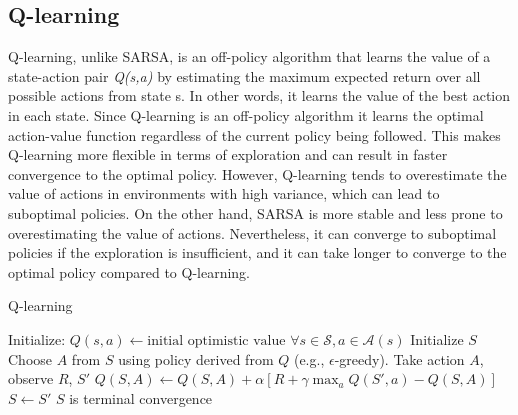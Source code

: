 \subsection{Q-learning}
Q-learning, unlike SARSA, is an off-policy algorithm that learns the value of a state-action pair \textit{Q(s,a)} by estimating the maximum expected return over all possible actions from state s. In other words, it learns the value of the best action in each state. Since Q-learning is an off-policy algorithm it learns the optimal action-value function regardless of the current policy being followed. This makes Q-learning more flexible in terms of exploration and can result in faster convergence to the optimal policy. However, Q-learning tends to overestimate the value of actions in environments with high variance, which can lead to suboptimal policies. On the other hand, SARSA is more stable and less prone to overestimating the value of actions. Nevertheless, it can converge to suboptimal policies if the exploration is insufficient, and it can take longer to converge to the optimal policy compared to Q-learning.
\begin{algorithm}
\caption{Q-learning}\label{algo:QL}
\begin{algorithmic}[1]
\State Initialize:
\State \hspace{0.5cm} $Q(s,a) \gets \text{initial optimistic value } \forall s\in \mathcal{S}, a\in \mathcal{A}(s)$
\Repeat
\State Initialize $S$
\State Choose $A$ from $S$ using policy derived from $Q$ (e.g., $\epsilon$-greedy).
\Repeat
\State Take action $A$, observe $R$, $S'$
\State $Q(S,A) \gets Q(S,A) + \alpha \left[R + \gamma \max_a Q(S',a) - Q(S,A)\right]$
\State $S \gets S'$
\Until $S$ is terminal
\Until convergence
\end{algorithmic}
\end{algorithm}

